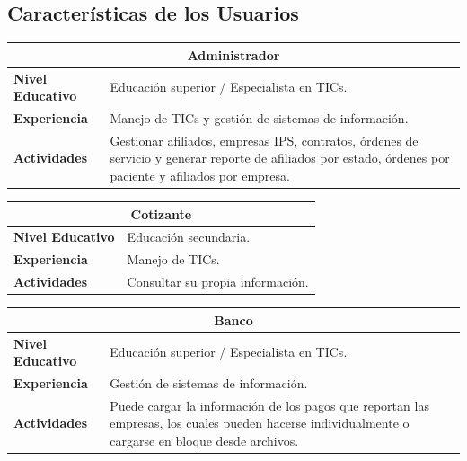 \documentclass[12pt,a4paper]{article}
\begin{document}
\subsection{Características de los Usuarios}
\begin{center}
\begin{tabular}{|p{3.5cm}| p{11.5cm}|}
\hline 
\multicolumn{2}{|c|}{\textbf{Administrador}} \\ 
\hline 
\textbf{Nivel Educativo} & Educación superior / Especialista en TICs.\\ 
\hline 
\textbf{Experiencia} & Manejo de TICs y gestión de sistemas de información. \\ 
\hline 
\textbf{Actividades} & Gestionar afiliados, empresas IPS, contratos, órdenes de servicio y generar reporte de afiliados por estado, órdenes por paciente y afiliados por empresa. \\ 
\hline 
\end{tabular}
\vspace{5mm}

\begin{tabular}{|p{3.5cm}| p{11.5cm}|}
\hline 
\multicolumn{2}{|c|}{\textbf{Cotizante}} \\ 
\hline 
\textbf{Nivel Educativo} & Educación secundaria.\\ 
\hline 
\textbf{Experiencia} & Manejo de TICs.\\ 
\hline 
\textbf{Actividades} & Consultar su propia información.\\ 
\hline 
\end{tabular}
\vspace{5mm}

\begin{tabular}{|p{3.5cm}| p{11.5cm}|}
\hline 
\multicolumn{2}{|c|}{\textbf{Banco}} \\ 
\hline 
\textbf{Nivel Educativo} & Educación superior / Especialista en TICs.\\ 
\hline 
\textbf{Experiencia} & Gestión de sistemas de información.\\ 
\hline 
\textbf{Actividades} & Puede cargar la información de los pagos que reportan las empresas, los cuales pueden hacerse individualmente o cargarse en bloque desde archivos.\\ 
\hline 
\end{tabular}
\vspace{5mm}
\end{center}
\end{document}
